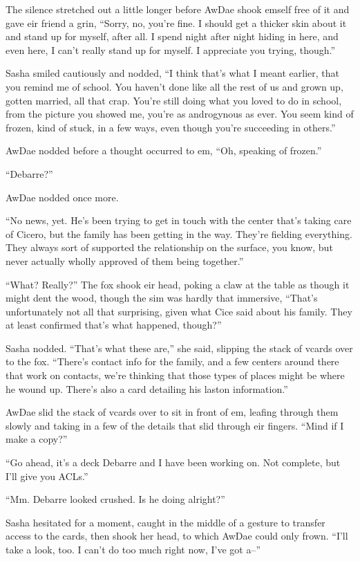 The silence stretched out a little longer before AwDae shook emself free of it and gave eir friend a grin, ``Sorry, no, you're fine.  I should get a thicker skin about it and stand up for myself, after all.  I spend night after night hiding in here, and even here, I can't really stand up for myself.  I appreciate you trying, though.''

Sasha smiled cautiously and nodded, ``I think that's what I meant earlier, that you remind me of school.  You haven't done like all the rest of us and grown up, gotten married, all that crap.  You're still doing what you loved to do in school, from the picture you showed me, you're as androgynous as ever.  You seem kind of frozen, kind of stuck, in a few ways, even though you're succeeding in others.''

AwDae nodded before a thought occurred to em, ``Oh, speaking of frozen.''

``Debarre?''

AwDae nodded once more.

``No news, yet.  He's been trying to get in touch with the center that's taking care of Cicero, but the family has been getting in the way.  They're fielding everything.  They always sort of supported the relationship on the surface, you know, but never actually wholly approved of them being together.''

``What?  Really?''  The fox shook eir head, poking a claw at the table as though it might dent the wood, though the sim was hardly that immersive, ``That's unfortunately not all that surprising, given what Cice said about his family.  They at least confirmed that's what happened, though?''

Sasha nodded. ``That's what these are,'' she said, slipping the stack of vcards over to the fox.  ``There's contact info for the family, and a few centers around there that work on contacts, we're thinking that those types of places might be where he wound up.  There's also a card detailing his laston information.''

AwDae slid the stack of vcards over to sit in front of em, leafing through them slowly and taking in a few of the details that slid through eir fingers.  ``Mind if I make a copy?''

``Go ahead, it's a deck Debarre and I have been working on.  Not complete, but I'll give you ACLs.''

``Mm.  Debarre looked crushed.  Is he doing alright?''

Sasha hesitated for a moment, caught in the middle of a gesture to transfer access to the cards, then shook her head, to which AwDae could only frown.  ``I'll take a look, too.  I can't do too much right now, I've got a--''

